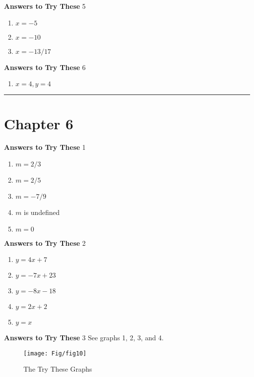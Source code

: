 \documentclass[a4paper]{JAC2003}
\begin{document}
\noindent\textcolor{red!75!black}{\textbf{Answers to Try These}} 5
\begin{enumerate}
\item $x=-5$

\item $x=-10$

\item $x=-13 / 17$
\end{enumerate}

\noindent\textcolor{red!75!black}{\textbf{Answers to Try These}} 6  %
\begin{enumerate}
    \item $x=4, y=4$
\end{enumerate}
\noindent\rule[0.5ex]{\linewidth}{1pt}

\section{Chapter 6}

\noindent\textcolor{red!75!black}{\textbf{Answers to Try These}} 1
\begin{enumerate}
\item $m=2 / 3$

\item $m=2 / 5$

\item $m=-7 / 9$

\item $m$ is undefined

\item $m=0$
\end{enumerate}

\noindent\textcolor{red!75!black}{\textbf{Answers to Try These}} 2
\begin{enumerate}
\item $y=4 x+7$

\item $y=-7 x+23$

\item $y=-8 x-18$

\item $y=2 x+2$

\item $y=x$
\end{enumerate}

\noindent\textcolor{red!75!black}{\textbf{Answers to Try These}} 3 See graphs 1, 2, 3, and 4.

\begin{figure}[H]
\centering
\caption{The Try These Graphs}
\texttt{[image: Fig/fig10]} %
\end{figure}
\end{document}
